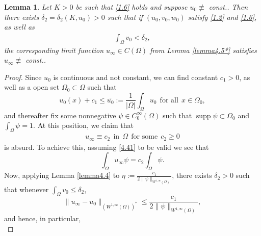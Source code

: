 \documentclass[12pt]{article}
\theoremstyle{plain}
\newtheorem{lemma}{Lemma}[section]
\theoremstyle{definition}
\numberwithin{equation}{section}
\begin{document}
\begin{lemma}\label{lemma4.7}
Let $K > 0$ be such that \eqref{1.6} holds and suppose $u_0\not\equiv$ const.. Then there exists $\delta_2=\delta_2(K,u_0)>0$ such that if $(u_0,v_0,w_0)$ satisfy \eqref{1.2} and \eqref{1.6}, as well as
\begin{align*}
    \int_{\Omega}v_0< \delta_2,
\end{align*}
the corresponding limit function $u_{\infty}\in C(\Omega)$ from Lemma \ref{lemma4.5*} satisfies
$u_{\infty} \not\equiv$ const..
\end{lemma}
\begin{proof}
     Since $u_{0}$ is continuous and not constant, we can find constant $c_{1}>0$, as well as a open set $\Omega_0\subset\Omega$ such that
     \begin{equation}\label{4.39}
     u_{0}(x)+c_1\leq\overline{u_0}:=\frac1{|\Omega|}\int_\Omega u_0~~\mbox{for all}~~x\in\Omega_0,
      \end{equation}
      and thereafter fix some nonnegative $\psi\in C^{\infty}_{0}(\Omega)$ such that $\operatorname{supp}\psi\subset \Omega_0$ and $\int_\Omega \psi=1$.
      At this position, we claim that
     \begin{align}\label{4.41}
        u_{\infty}\equiv c_2~~\mbox{in}~~\Omega~~\mbox{for some}~~c_2\geq0
    \end{align}
    is absurd. To achieve this, assuming \eqref{4.41} to be valid we see that
    \begin{equation}\label{4.42}
    \int_\Omega u_{\infty}\psi=c_2\int_\Omega\psi.
    \end{equation}
      Now, applying Lemma \ref{lemma4.4} to $\eta:=\frac{c_1}{2\|\psi\|_{W^{1,\infty}(\Omega)}}$, there exists $\delta_2>0$ such that whenever $\int_\Omega v_0\leq\delta_2$,
      \begin{equation}\label{4.30}
      \|u_\infty-u_0\|_{(W^{1,\infty}(\Omega))^*}\leq \frac{c_1}{2\|\psi\|_{W^{1,\infty}(\Omega)}},%
      \end{equation}
      and hence, in particular,
      \begin{equation}\label{4.44}

\end{equation}
\end{proof}
\end{document}
